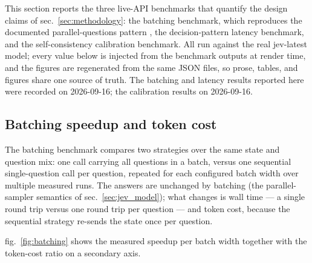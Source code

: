\documentclass[
  english,
]{article}
\begin{document}
This section reports the three live-API benchmarks that quantify the
design claims of sec.~\ref{sec:methodology}: the batching benchmark,
which reproduces the documented parallel-questions pattern
\citep{typesafe2026patterns}, the decision-pattern latency benchmark,
and the self-consistency calibration benchmark. All run against the real
jev-latest model; every value below is injected from the benchmark
outputs at render time, and the figures are regenerated from the same
JSON files, so prose, tables, and figures share one source of truth. The
batching and latency results reported here were recorded on 2026-09-16;
the calibration results on 2026-09-16.

\subsection{Batching speedup and token
cost}\label{batching-speedup-and-token-cost}

The batching benchmark compares two strategies over the same state and
question mix: one call carrying all questions in a batch, versus one
sequential single-question call per question, repeated for each
configured batch width over multiple measured runs. The answers are
unchanged by batching (the parallel-sampler semantics of
sec.~\ref{sec:jev_model}); what changes is wall time --- a single round
trip versus one round trip per question --- and token cost, because the
sequential strategy re-sends the state once per question.

fig.~\ref{fig:batching} shows the measured speedup per batch width
together with the token-cost ratio on a secondary axis.
\end{document}
